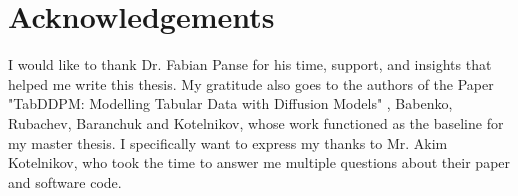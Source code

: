 
\chapter*{Acknowledgements}
\label{ch:Acknowledgements}
\thispagestyle{empty}
I would like to thank Dr. Fabian Panse for his time, support, and insights that helped me write this thesis.
My gratitude also goes to the authors of the Paper "TabDDPM: Modelling Tabular Data with Diffusion Models" \cite{kotelnikov2022TabDDPMModellingTabular},
Babenko, Rubachev, Baranchuk and Kotelnikov, whose work functioned as the baseline for my master thesis.
I specifically want to express my thanks to Mr. Akim Kotelnikov, who took the time to answer me multiple questions about their paper and software code.


\cleardoublepage
\newpage \thispagestyle{empty}
